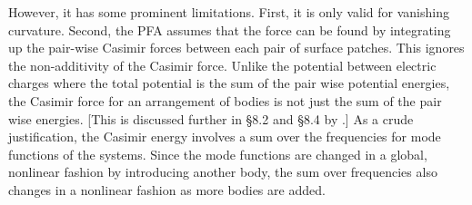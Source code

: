 However, it has some prominent limitations.  First, it is only valid for vanishing curvature.
Second, the PFA assumes that the force can be found by integrating up
the pair-wise Casimir forces between each pair of surface patches.  This ignores the non-additivity
of the Casimir force.  Unlike the potential between electric charges where the total potential is
the sum of the pair wise potential energies, the Casimir force for an arrangement
of bodies is not just the sum of the pair wise energies. [This is discussed further in \S{8.2} and \S{8.4} by \citet{Milonni1994}.]
As a crude justification, the Casimir energy involves a sum over the frequencies for mode functions 
of the systems.  Since the mode functions are changed in a global, nonlinear fashion by introducing another
body, the sum over frequencies also changes in a nonlinear fashion as more bodies are added.  


